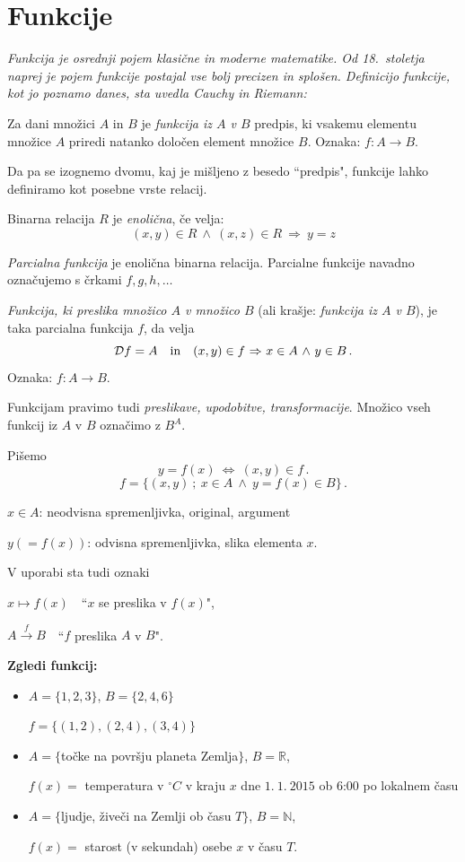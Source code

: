 \documentclass[11pt,paper=b5,DIV=13,headinclude,footinclude]{scrbook}
\def\inn {{~\wedge~}}
\def\sledi {{~\Rightarrow~}}
\def\cee {{~\Leftrightarrow~}}
\begin{document}
\section{Funkcije}

{\em Funkcija je osrednji pojem klasične in moderne matematike. Od 18.~stoletja naprej
je pojem funkcije postajal vse bolj precizen in splošen. Definicijo funkcije, kot jo poznamo danes, sta uvedla Cauchy in Riemann:}

\medskip
Za dani množici $A$ in $B$ je {\em funkcija iz $A$ v $B$} predpis, ki vsakemu elementu množice $A$ priredi natanko določen element množice $B$.
Oznaka: $f:A\to B$.

\medskip
Da pa se izognemo dvomu, kaj je mišljeno z besedo ``predpis", funkcije lahko definiramo kot posebne vrste relacij.

\medskip
Binarna relacija $R$ je {\em enolična}, če velja:
$$(x,y)\in R \inn (x,z)\in R\sledi y = z$$

{\em Parcialna funkcija} je enolična binarna relacija. Parcialne funkcije navadno označujemo s črkami $f, g,h,\ldots$

\emph{ Funkcija, ki preslika množico $A$ v množico $B$} (ali krašje: {\em funkcija iz $A$ v $B$}), je taka parcialna funkcija $f$, da
velja
$${\cal D}f= A \textrm{~~~in~~~} (x,y)\in f\sledi x\in A\inn y\in B\,.$$
Oznaka: $f:A\to B$.

Funkcijam pravimo tudi {\em preslikave, upodobitve, transformacije}.
Množico vseh funkcij iz $A$ v $B$ označimo z $B^A$.

\bigskip

Pišemo
$$y=f(x)\cee (x,y)\in f\,.$$
$$f = \{(x,y)~;~x\in A\inn y = f(x)\in B\}\,.$$

$x\in A$: neodvisna spremenljivka, original, argument

$y (= f(x))$: odvisna spremenljivka, slika elementa $x$.

\medskip

V uporabi sta tudi oznaki

$x\mapsto f(x)$~~``$x$ se preslika v $f(x)$",

$A\overset{f}{\to} B$~~``$f$ preslika $A$ v $B$".

\bigskip
\textbf{ Zgledi funkcij:}
\begin{itemize}
  \item $A = \{1,2,3\}$, $B = \{2,4,6\}$

  $f = \{(1,2),(2,4),(3,4)\}$

  \item $A = \{$točke na površju planeta Zemlja$\}$, $B = \mathbb{R}$,

$f(x) = $ temperatura v $^\circ C$ v kraju $x$ dne $1.~1.~2015$ ob 6:00 po lokalnem času

  \item $A = \{$ljudje, živeči na Zemlji ob času $T\}$, $B = \mathbb{N}$,

$f(x) = $ starost (v sekundah) osebe $x$ v času $T$.
\end{itemize}
\end{document}
